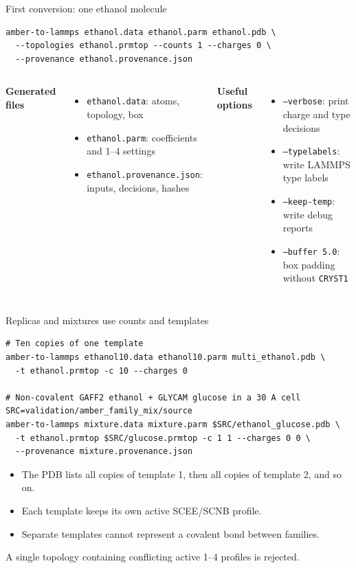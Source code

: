 \documentclass[aspectratio=169,11pt]{beamer}
\begin{document}
\begin{frame}[fragile]{First conversion: one ethanol molecule}
\begin{lstlisting}[style=terminal]
amber-to-lammps ethanol.data ethanol.parm ethanol.pdb \
  --topologies ethanol.prmtop --counts 1 --charges 0 \
  --provenance ethanol.provenance.json
\end{lstlisting}

\begin{columns}[T,onlytextwidth]
\textbf{Generated files}
\begin{itemize}
  \item \texttt{ethanol.data}: atoms, topology, box
  \item \texttt{ethanol.parm}: coefficients and 1--4 settings
  \item \texttt{ethanol.provenance.json}: inputs, decisions, hashes
\end{itemize}
\column{0.48\textwidth}
\textbf{Useful options}
\begin{itemize}
  \item \texttt{--verbose}: print charge and type decisions
  \item \texttt{--typelabels}: write LAMMPS type labels
  \item \texttt{--keep-temp}: write debug reports
  \item \texttt{--buffer 5.0}: box padding without \texttt{CRYST1}
\end{itemize}
\end{columns}
\end{frame}

\begin{frame}[fragile]{Replicas and mixtures use counts and templates}
\begin{lstlisting}[style=terminal]
# Ten copies of one template
amber-to-lammps ethanol10.data ethanol10.parm multi_ethanol.pdb \
  -t ethanol.prmtop -c 10 --charges 0

# Non-covalent GAFF2 ethanol + GLYCAM glucose in a 30 A cell
SRC=validation/amber_family_mix/source
amber-to-lammps mixture.data mixture.parm $SRC/ethanol_glucose.pdb \
  -t ethanol.prmtop $SRC/glucose.prmtop -c 1 1 --charges 0 0 \
  --provenance mixture.provenance.json
\end{lstlisting}

\begin{itemize}
  \item The PDB lists all copies of template 1, then all copies of template 2, and so on.
  \item Each template keeps its own active SCEE/SCNB profile.
  \item Separate templates cannot represent a covalent bond between families.
\end{itemize}
\alert{A single topology containing conflicting active 1--4 profiles is rejected.}
\end{frame}
\end{document}
